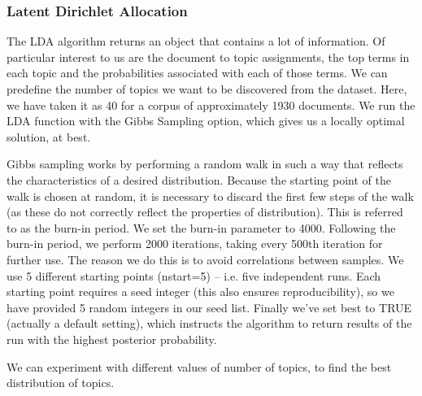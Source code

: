 \documentclass[journal]{IEEEtran}
\begin{document}
\subsubsection{Latent Dirichlet Allocation}
The LDA algorithm returns an object that contains a lot of information. Of particular interest to us are the document to topic assignments, the top terms in each topic and the probabilities associated with each of those terms. We can predefine the number of topics we want to be discovered from the dataset. Here, we have taken it as 40 for a corpus of approximately 1930 documents. We run the LDA function with the Gibbs Sampling option, which gives us a locally optimal solution, at best.

Gibbs sampling works by performing a random walk in such a way that reflects the characteristics of a desired distribution. Because the starting point of the walk is chosen at random, it is necessary to discard the first few steps of the walk (as these do not correctly reflect the properties of distribution). This is referred to as the burn-in period. We set the burn-in parameter to  4000. Following the burn-in period, we perform 2000 iterations, taking every 500th  iteration for further use.  The reason we do this is to avoid correlations between samples. We use 5 different starting points (nstart=5) – i.e. five independent runs. Each starting point requires a seed integer (this also ensures reproducibility),  so we have provided 5 random integers in our seed list. Finally we’ve set best to TRUE (actually a default setting), which instructs the algorithm to return results of the run with the highest posterior probability.

We can experiment with different values of number of topics, to find the best distribution of topics. 

\vspace{0.5cm}
\end{document}
